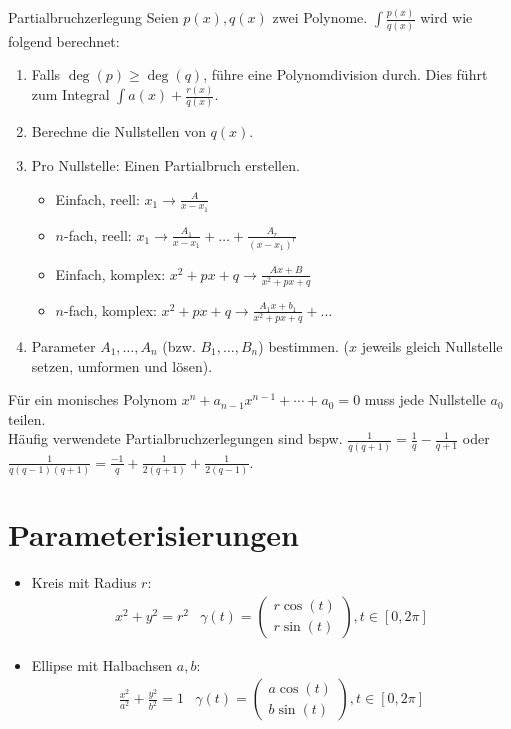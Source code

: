 \documentclass[a4paper,10pt]{article}
\begin{document}
\begin{mainbox}{Partialbruchzerlegung}
  Seien $p(x), q(x)$ zwei Polynome. $\int \frac{p(x)}{q(x)}$ wird wie folgend berechnet:
  \begin{enumerate}
   \item Falls $\deg(p) \ge \deg(q)$, führe eine Polynomdivision durch. Dies führt zum Integral $\int a(x) + \frac{r(x)}{q(x)}$.
   \item Berechne die Nullstellen von $q(x)$.
   \item Pro Nullstelle: Einen Partialbruch erstellen.
   \begin{itemize}[left=0pt]
    \item Einfach, reell: $x_1 \to \frac{A}{x - x_1}$
    \item $n$-fach, reell: $x_1 \to \frac{A_1}{x - x_1} + \ldots + \frac{A_r}{(x-x_1)^r}$ 
    \item Einfach, komplex: $x^2 + px + q \to \frac{Ax + B} {x^2 + px + q}$
    \item $n$-fach, komplex: $x^2 + px + q \to \frac{A_1x+b_1}{x^2+px+q} + \ldots$
   \end{itemize}
   \item Parameter $A_1, \ldots, A_n$ (bzw. $B_1, \ldots, B_n$) bestimmen. ($x$ jeweils gleich Nullstelle setzen, umformen und lösen).
 
  \end{enumerate}
 \end{mainbox}

Für ein monisches Polynom $x^n + a_{n-1} x^{n-1} + \cdots + a_0 = 0$ muss jede Nullstelle $a_0$ teilen.\\

Häufig verwendete Partialbruchzerlegungen sind bspw. $\frac{1}{q(q+1)} = \frac{1}{q} - \frac{1}{q + 1}$ oder $\frac{1}{q(q-1)(q+1)} = \frac{-1}{q} + \frac{1}{2(q+1)} + \frac{1}{2(q-1)}$.

\section{Parameterisierungen}

\begin{itemize}
  \item Kreis mit Radius $r$:{
    \begin{align*} 
      & x^2 + y^2 = r^2 & \gamma(t) = \begin{pmatrix} r \cos(t) \\ r \sin(t) \end{pmatrix}, t \in [0, 2\pi] &
    \end{align*}
  }
  \item Ellipse mit Halbachsen $a, b$:{
    \begin{align*} 
      & \frac{x^2}{a^2} + \frac{y^2}{b^2} = 1 & \gamma(t) = \begin{pmatrix} a \cos(t) \\ b \sin(t) \end{pmatrix}, t \in [0, 2\pi] &
    \end{align*}
  }
\end{itemize}
\end{document}
